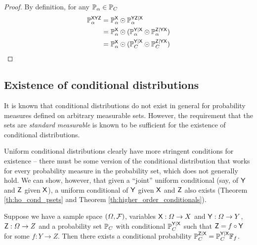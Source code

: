 \begin{proof}
By definition, for any $\mathbb{P}_\alpha\in \mathbb{P}_C$
\begin{align}
    \mathbb{P}_\alpha^{\mathsf{XYZ}} &= \mathbb{P}_\alpha^{\mathsf{X}}\odot \mathbb{P}_\alpha^{\mathsf{YZ}|\mathsf{X}}\\
                               &= \mathbb{P}_\alpha^{\mathsf{X}}\odot(\mathbb{P}_\alpha^{\mathsf{Y}|\mathsf{X}}\odot \mathbb{P}_\alpha^{\mathsf{Z}|\mathsf{YX}})\\
                               &= \mathbb{P}_\alpha^{\mathsf{X}}\odot(\mathbb{P}_C^{\mathsf{Y}|\mathsf{X}}\odot \mathbb{P}_C^{\mathsf{Z}|\mathsf{YX}})
\end{align}
\end{proof}

\subsection{Existence of conditional distributions}

It is known that conditional distributions do not exist in general for probability measures defined on arbitrary measurable sets. However, the requirement that the sets are \emph{standard measurable} is known to be sufficient for the existence of conditional distributions. 

Uniform conditional distributions clearly have more stringent conditions for existence -- there must be some version of the conditional distribution that works for every probability measure in the probability set, which does not generally hold. We can show, however, that given a ``joint'' uniform conditional (say, of $\mathsf{Y}$ and $\mathsf{Z}$ given $\mathsf{X}$), a uniform conditional of $\mathsf{Y}$ given $\mathsf{X}$ and $\mathsf{Z}$ also exists (Theorem \ref{th:ho_cond_psets} and Theorem \ref{th:higher_order_conditionals}).

\begin{lemma}\label{th:recurs_pushf}
Suppose we have a sample space $(\Omega,\mathcal{F})$, variables $\mathsf{X}:\Omega\to X$ and $\mathsf{Y}:\Omega\to Y$, $\mathsf{Z}:\Omega\to Z$ and a probability set $\mathbb{P}_C$ with conditional $\mathbb{P}_C^{\mathsf{Y}|\mathsf{X}}$ such that $\mathsf{Z}=f\circ \mathsf{Y}$ for some $f:Y\to Z$. Then there exists a conditional probability $\mathbb{P}_C^{\mathsf{Z}|\mathsf{X}}=\mathbb{P}_C^{\mathsf{Y}|\mathsf{X}}\mathbb{F}_{f}$.
\end{lemma}

